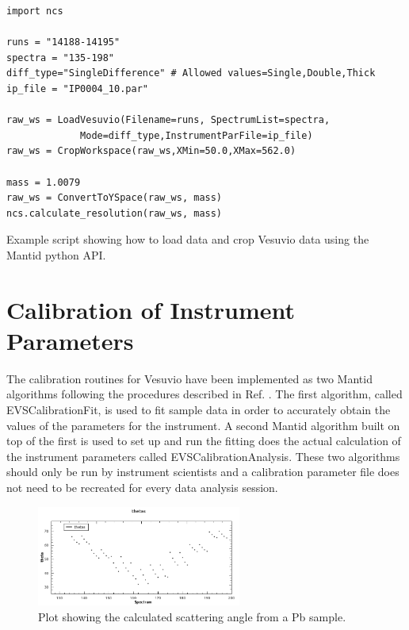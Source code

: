 \documentclass[paper=a4, fontsize=11pt]{scrartcl}	%
\numberwithin{equation}{section}															%
\numberwithin{figure}{section}																%
\numberwithin{table}{section}
\begin{document}
\begin{listing}[H]
\begin{verbatim}
import ncs

runs = "14188-14195"
spectra = "135-198"
diff_type="SingleDifference" # Allowed values=Single,Double,Thick
ip_file = "IP0004_10.par"

raw_ws = LoadVesuvio(Filename=runs, SpectrumList=spectra,
		     Mode=diff_type,InstrumentParFile=ip_file)
raw_ws = CropWorkspace(raw_ws,XMin=50.0,XMax=562.0)

mass = 1.0079
raw_ws = ConvertToYSpace(raw_ws, mass)
ncs.calculate_resolution(raw_ws, mass)
\end{verbatim}
\caption{Example script showing how to load data and crop Vesuvio data using the Mantid python API.}
\label{lst:resolution}
\end{listing}

\section{Calibration of Instrument Parameters}
\label{sec:calibration}
The calibration routines for Vesuvio have been implemented as two Mantid algorithms following the procedures described in Ref. \cite{mayers2011calibration}. The first algorithm, called EVSCalibrationFit, is used to fit sample data in order to accurately obtain the values of the parameters for the instrument. A second Mantid algorithm built on top of the first is used to set up and run the fitting does the actual calculation of the instrument parameters called EVSCalibrationAnalysis. These two algorithms should only be run by instrument scientists and a calibration parameter file does not need to be recreated for every data analysis session.


\begin{figure}[H]
\centering
\includegraphics[width=0.6\textwidth]{img/calib-theta.png}
\caption{Plot showing the calculated scattering angle from a Pb sample.}
\label{fig:calib-theta}
\end{figure}
\end{document}
